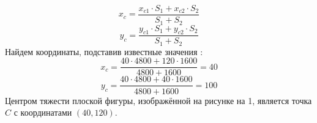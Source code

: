 \documentclass[a4paper,11pt]{article}
\begin{document}
\begin{flushleft}
\begin{enumerate}[label=\Roman{*}, ref=(\roman{*})]
\begin{equation}
				x_c = \frac{x_{c1}\cdot S_1 + x_{c2}\cdot S_2}{S_1 + S_2}
			\end{equation}
			\begin{equation}
				y_c = \frac{y_{c1}\cdot S_1 + y_{c2}\cdot S_2}{S_1 + S_2}
			\end{equation}
			Найдем координаты, подставив известные значения : 
			\begin{equation}
				x_c = \frac{40\cdot 4800 + 120\cdot 1600}{4800 + 1600} = 40
			\end{equation}
			\begin{equation}
				y_c = \frac{40\cdot 4800 + 40\cdot 1600}{4800 + 1600} = 100
			\end{equation}
					Центром тяжести плоской фигуры, изображённой на рисунке на 1, является точка   
$C$ с координатами $(40,120)$.			  
 		\end{enumerate}
	
 	\end{flushleft} 		
\end{document}
